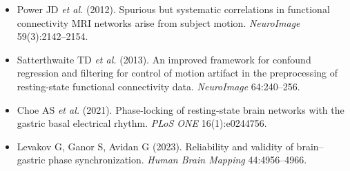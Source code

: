 \documentclass[11pt]{article}
\begin{document}
\begin{itemize}
\item Power JD \textit{et al.} (2012). Spurious but systematic
correlations in functional connectivity MRI networks arise from
subject motion. \textit{NeuroImage} 59(3):2142--2154.
\item Satterthwaite TD \textit{et al.} (2013). An improved framework
for confound regression and filtering for control of motion artifact in
the preprocessing of resting-state functional connectivity data.
\textit{NeuroImage} 64:240--256.
\item Choe AS \textit{et al.} (2021). Phase-locking of resting-state
brain networks with the gastric basal electrical rhythm. \textit{PLoS
ONE} 16(1):e0244756.
\item Levakov G, Ganor S, Avidan G (2023). Reliability and validity of
brain--gastric phase synchronization. \textit{Human Brain Mapping}
44:4956--4966.
\end{itemize}
\end{document}
